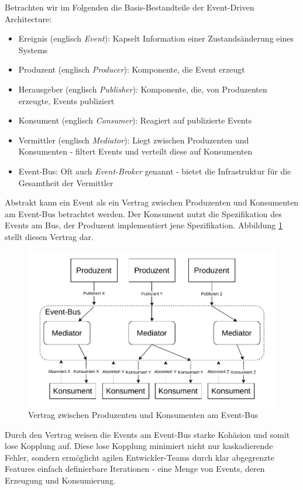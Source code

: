 \documentclass[acmtog]{acmart}
\begin{document}
Betrachten wir im Folgenden die Basis-Bestandteile der Event-Driven Architecture:
\begin{itemize}
  \item Ereignis (englisch \textit{Event}): Kapselt Information einer Zustandsänderung eines Systems
  \item Produzent (englisch \textit{Producer}): Komponente, die Event erzeugt
  \item Herausgeber (englisch \textit{Publisher}): Komponente, die, von Produzenten erzeugte, Events publiziert
  \item Konsument (englisch \textit{Consumer}): Reagiert auf publizierte Events
  \item Vermittler (englisch \textit{Mediator}): Liegt zwischen Produzenten und Konsumenten - filtert Events und verteilt diese auf Konsumenten
  \item Event-Bus: Oft auch \textit{Event-Broker} genannt - bietet die Infrastruktur für die Gesamtheit der Vermittler
\end{itemize}
Abstrakt kann ein Event als ein Vertrag zwischen Produzenten und Konsumenten am Event-Bus betrachtet werden.
Der Konsument nutzt die Spezifikation des Events am Bus, der Produzent implementiert jene Spezifikation.
Abbildung \ref{fig:eda} stellt diesen Vertrag dar.

\begin{figure}[!h]
  \centering
  \includegraphics[width=\linewidth]{images/eda/eda.drawio}
  \caption{Vertrag zwischen Produzenten und Konsumenten am Event-Bus}
  \label{fig:eda}
\end{figure}

Durch den Vertrag weisen die Events am Event-Bus starke Kohäsion und somit lose Kopplung auf.
Diese lose Kopplung minimiert nicht nur kaskadierende Fehler, sondern ermöglicht agilen Entwickler-Teams durch klar abgegrenzte Features einfach definierbare Iterationen
- eine Menge von Events, deren Erzeugung und Konsumierung.
\end{document}
